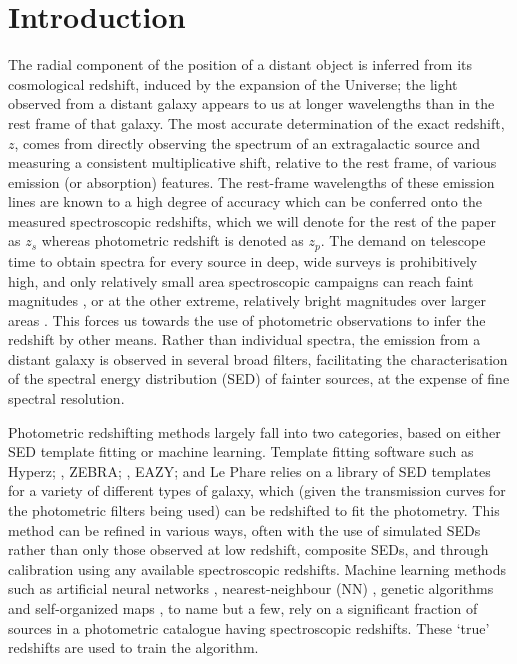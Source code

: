 \documentclass[useAMS,usenatbib,fleqn]{mn2e}
\begin{document}
\section{Introduction}
The radial component of the position of a distant object is inferred from its cosmological redshift, induced by the expansion of the Universe; the light observed from a distant galaxy appears to us at longer wavelengths than in the rest frame of that galaxy. The most accurate determination of the exact redshift, $z$, comes from directly observing the spectrum of an extragalactic source and measuring a consistent multiplicative shift, relative to the rest frame, of various emission (or absorption) features. The rest-frame wavelengths of these emission lines are known to a high degree of accuracy which can be conferred onto the measured spectroscopic redshifts, which we will denote for the rest of the paper as $z_{s}$ whereas photometric redshift is denoted as $z_{p}$. The demand on telescope time to obtain spectra for every source in deep, wide surveys is prohibitively high, and only relatively small area spectroscopic campaigns can reach faint magnitudes \citep[e.g.][]{Lilly2009,LeFevre2013,LeFevre2015}, or at the other extreme, relatively bright magnitudes over larger areas \citep[e.g.][]{2dfgrs,GAMA,SDSS3}.
This forces us towards the use of photometric observations to infer the redshift by other means. Rather than individual spectra, the emission from a distant galaxy is observed in several broad filters, facilitating the characterisation of the spectral energy distribution (SED) of fainter sources, at the expense of fine spectral resolution.

Photometric redshifting methods largely fall into two categories, based on either SED template fitting or machine learning. Template fitting software such as {\sc Hyperz}; \citep[][]{Hyperz}, {\sc ZEBRA}; \citep{ZEBRA}, {\sc EAZY}; \citep[][]{EAZY} and {\sc Le Phare} \citep[][]{Ilbert2006} relies on a library of SED templates for a variety of different types of galaxy, which (given the transmission curves for the photometric filters being used) can be redshifted to fit the photometry. This method can be refined in various ways, often with the use of simulated SEDs rather than only those observed at low redshift, composite SEDs, and through calibration using any available spectroscopic redshifts. Machine learning methods such as artificial neural networks \citep[e.g. {\sc ANNz};][]{Firth2003,Collister04}, nearest-neighbour (NN) \citep{Ball2008}, genetic algorithms \citep[e.g.][]{Hogan2015} and self-organized maps \citep[][]{Geach2012}, to name but a few, rely on a significant fraction of sources in a photometric catalogue having spectroscopic redshifts. These `true' redshifts are used to train the algorithm. 
\end{document}
